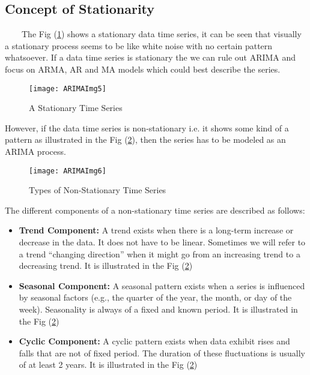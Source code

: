 \subsection{Concept of Stationarity}
\
\
\
\
The Fig (\ref{figc7h5}) shows a stationary data time series, it can be seen that visually a stationary process seems to be like white noise with no certain pattern whatsoever. If a data time series is stationary the we can rule out ARIMA and focus on ARMA, AR and MA models which could best describe the series.

\begin{figure}[H]
\centering
\texttt{[image: ARIMAImg5]}
\caption{A Stationary Time Series}
\label{figc7h5} %
\end{figure}

However, if the data time series is non-stationary i.e. it shows some kind of a pattern as illustrated in the Fig (\ref{figc7h6}), then the series has to be modeled as an ARIMA process.

\begin{figure}[H]
\centering
\texttt{[image: ARIMAImg6]}
\caption{Types of Non-Stationary Time Series}
\label{figc7h6} %
\end{figure}

The different components of a non-stationary time series are described as follows:

\begin{itemize}

\item \textbf{Trend Component:} A trend exists when there is a long-term increase or decrease in the data. It does not have to be linear. Sometimes we will refer to a trend “changing direction” when it might go from an increasing trend to a decreasing trend. It is illustrated in the Fig (\ref{figc7h6})

\item \textbf{Seasonal Component:} A seasonal pattern exists when a series is influenced by seasonal factors (e.g., the quarter of the year, the month, or day of the week). Seasonality is always of a fixed and known period. It is illustrated in the Fig (\ref{figc7h6})

\item \textbf{Cyclic Component:} A cyclic pattern exists when data exhibit rises and falls that are not of fixed period. The duration of these fluctuations is usually of at least 2 years. It is illustrated in the Fig (\ref{figc7h6})

\end{itemize}


